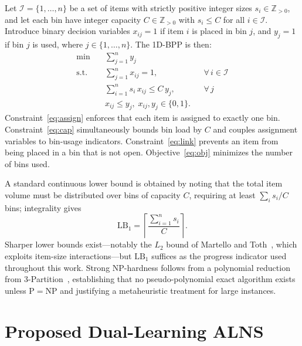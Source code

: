 \documentclass[conference]{IEEEtran}
\begin{document}
Let $\mathcal{I}=\{1,\dots,n\}$ be a set of items with strictly positive
integer sizes $s_i\in\mathbb{Z}_{>0}$, and let each bin have integer capacity
$C\in\mathbb{Z}_{>0}$ with $s_i\le C$ for all $i\in\mathcal{I}$.  Introduce
binary decision variables $x_{ij}=1$ if item $i$ is placed in bin $j$, and
$y_j=1$ if bin $j$ is used, where $j\in\{1,\dots,n\}$.  The 1D-BPP is then:
%
\begin{align}
	\min \quad       & \sum_{j=1}^{n} y_j                                                      \label{eq:obj}                                                   \\
	\text{s.t.}\quad & \sum_{j=1}^{n} x_{ij}=1,                                                               &  & \forall\,i\in\mathcal{I}   \label{eq:assign} \\
	                 & \sum_{i=1}^{n} s_i\,x_{ij}\le C\,y_j,                                                  &  & \forall\,j                 \label{eq:cap}    \\
	                 & x_{ij}\le y_j,\; x_{ij},y_j\in\{0,1\}.                                                 &  & \label{eq:link}
\end{align}
%
Constraint~\eqref{eq:assign} enforces that each item is assigned to exactly one
bin.  Constraint~\eqref{eq:cap} simultaneously bounds bin load by $C$ and
couples assignment variables to bin-usage indicators.  Constraint~\eqref{eq:link}
prevents an item from being placed in a bin that is not open.
Objective~\eqref{eq:obj} minimizes the number of bins used.

A standard continuous lower bound is obtained by noting that the total item
volume must be distributed over bins of capacity $C$, requiring at least
$\sum_i s_i / C$ bins; integrality gives
%
\begin{equation}
	\mathrm{LB}_1=\left\lceil \frac{\sum_{i=1}^{n} s_i}{C} \right\rceil.
	\label{eq:lb}
\end{equation}
%
Sharper lower bounds exist---notably the $L_2$ bound of Martello and
Toth~\cite{bMartello}, which exploits item-size interactions---but
$\mathrm{LB}_1$ suffices as the progress indicator used throughout this work.
Strong NP-hardness follows from a polynomial reduction from
3-Partition~\cite{bGarey}, establishing that no pseudo-polynomial exact
algorithm exists unless P$=$NP and justifying a metaheuristic treatment for
large instances.

\section{Proposed Dual-Learning ALNS}\label{sec:approach}
\end{document}
